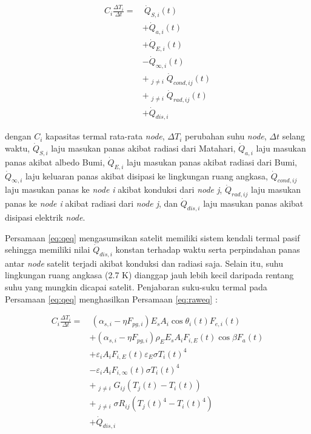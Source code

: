 \begin{equation}
\label{eq:qeq}
\begin{split}
	C_{i} \frac{\Delta T_i}{\Delta t} = &\ \dot{Q}_{S,i}(t)\\
	&+ \dot{Q}_{a,i}(t) \\
	&+ \dot{Q}_{E,i}(t) \\
	&- \dot{Q}_{\infty,i}(t) \\
	&+ \mathop{\sum_{j=1}^{N}}_{j \neq i} \dot{Q}_{cond,ij}(t) \\
	&+ \mathop{\sum_{j=1}^{N}}_{j \neq i} \dot{Q}_{rad,ij}(t) \\
	&+ \dot{Q}_{dis,i}
\end{split}
\end{equation}

dengan $C_i$ kapasitas termal rata-rata \textit{node}, $\Delta T_i$ perubahan
suhu \textit{node}, $\Delta t$ selang waktu, $\dot{Q}_{S,i}$ laju masukan panas
akibat radiasi dari Matahari, $\dot{Q}_{a,i}$ laju masukan panas akibat albedo
Bumi, $\dot{Q}_{E,i}$ laju masukan panas akibat radiasi dari Bumi,
$\dot{Q}_{\infty,i}$ laju keluaran panas akibat disipasi ke lingkungan ruang
angkasa, $\dot{Q}_{cond,ij}$ laju masukan panas ke \textit{node i} akibat
konduksi dari \textit{node j}, $\dot{Q}_{rad,ij}$ laju masukan panas ke
\textit{node i} akibat radiasi dari \textit{node j}, dan  $\dot{Q}_{dis,i}$
laju masukan panas akibat disipasi elektrik \textit{node}.

Persamaan \ref{eq:qeq} mengasumsikan satelit memiliki sistem kendali termal
pasif sehingga memiliki nilai $\dot{Q}_{dis,i}$ konstan terhadap waktu serta
perpindahan panas antar \textit{node} satelit terjadi akibat konduksi dan
radiasi saja. Selain itu, suhu lingkungan ruang angkasa (2.7 K) dianggap jauh
lebih kecil daripada rentang suhu yang mungkin dicapai satelit. Penjabaran
suku-suku termal pada Persamaan \ref{eq:qeq} menghasilkan Persamaan
\ref{eq:raweq} :

\begin{equation}
\label{eq:raweq}
\begin{split}
	C_{i} \frac{\Delta T_i}{\Delta t} = &\ \left(\alpha_{s,i} - \eta F_{pg,i}\right) E_s A_i \cos{\theta_{i}(t)} F_{e,i}(t) \\
	&+ \left(\alpha_{s,i} - \eta F_{pg,i}\right)\rho_{E} E_s A_i F_{i,E}(t) \cos{\beta} F_a(t) \\
	&+ \varepsilon_i A_i F_{i,E}(t) \varepsilon_E \sigma T_{i}(t)^4 \\
	&- \varepsilon_i A_i F_{i,\infty}(t) \sigma T_{i}(t)^4 \\
	&+ \mathop{\sum_{j=1}^{N}}_{j \neq i} G_{ij} \left(T_j(t) - T_i(t)\right) \\
	&+ \mathop{\sum_{j=1}^{N}}_{j \neq i} \sigma R_{ij}(T_{j}(t)^4-T_{i}(t)^4) \\
	&+ \dot{Q}_{dis,i}
\end{split}
\end{equation}

